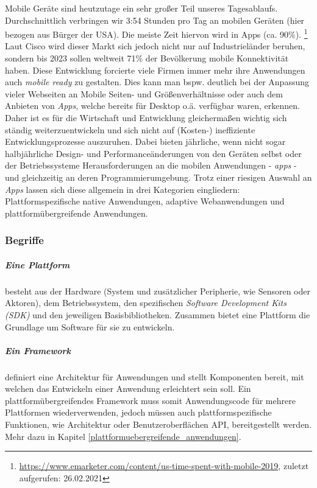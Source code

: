 \label{sec:mobile_development}
Mobile Geräte sind heutzutage ein sehr großer Teil unseres Tagesablaufs. Durchschnittlich verbringen wir 3:54 Stunden pro Tag an mobilen Geräten (hier bezogen aus Bürger der USA). Die meiste Zeit hiervon wird in Apps (ca. 90\%). \footnote{\url{https://www.emarketer.com/content/us-time-spent-with-mobile-2019}, zuletzt aufgerufen: 26.02.2021} 
Laut Cisco wird dieser Markt sich jedoch nicht nur auf Industrieländer beruhen, sondern bis 2023 sollen weltweit 71\% der Bevölkerung mobile Konnektivität haben. \cite{cisco2020}
Diese Entwicklung forcierte viele Firmen immer mehr ihre Anwendungen auch \textit{mobile ready} zu gestalten. Dies kann man bspw. deutlich bei der Anpassung vieler Webseiten an Mobile Seiten- und Größenverhältnisse oder auch dem Anbieten von \textit{Apps}, welche bereits für Desktop o.ä. verfügbar waren, erkennen. \\

Daher ist es für die Wirtschaft und Entwicklung gleichermaßen wichtig sich ständig weiterzuentwickeln und sich nicht auf (Kosten-) ineffiziente Entwicklungsprozesse auszuruhen. Dabei bieten jährliche, wenn nicht sogar halbjährliche Design- und Performanceänderungen von den Geräten selbst oder der Betriebssysteme Herausforderungen an die mobilen Anwendungen - \textit{apps} - und gleichzeitig an deren Programmierumgebung. Trotz einer riesigen Auswahl an \textit{Apps} lassen sich diese allgemein in drei Kategorien eingliedern: Plattformspezifische native Anwendungen, adaptive Webanwendungen und plattformübergreifende Anwendungen.

\subsubsection{Begriffe}
\subparagraph{Eine Plattform} besteht aus der Hardware (System und zusätzlicher Peripherie, wie Sensoren oder Aktoren), dem Betriebssystem, den spezifischen \textit{Software Development Kits (SDK)} und den jeweiligen Basisbibliotheken. 
Zusammen bietet eine Plattform die Grundlage um Software für sie zu entwickeln.
\subparagraph{Ein \textit{Framework}} definiert eine Architektur für Anwendungen und stellt Komponenten bereit, mit welchen das Entwickeln einer Anwendung erleichtert sein soll. \cite{johnson1988} 
Ein plattformübergreifendes Framework muss somit Anwendungscode für mehrere Plattformen wiederverwenden, jedoch müssen auch plattformspezifische Funktionen, wie Architektur oder Benutzeroberflächen API, bereitgestellt werden. Mehr dazu in Kapitel \ref{plattformuebergreifende_anwendungen}.

